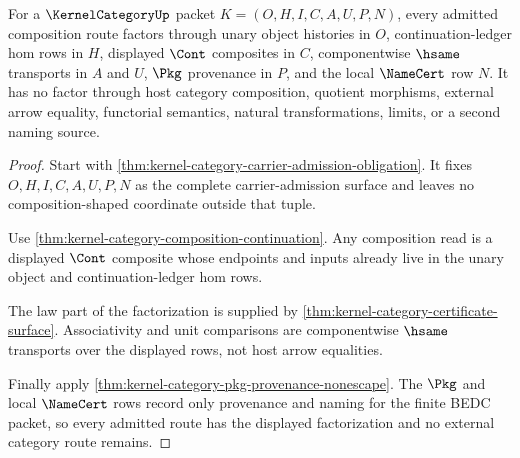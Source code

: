 \begin{theorem}
\label{thm:kernel-category-cont-route-factorization}
For a $\KernelCategoryUp$ packet $K=(O,H,I,C,A,U,P,N)$, every admitted
composition route factors through unary object histories in $O$,
continuation-ledger hom rows in $H$, displayed $\Cont$ composites in $C$,
componentwise $\hsame$ transports in $A$ and $U$, $\Pkg$ provenance in $P$,
and the local $\NameCert$ row $N$. It has no factor through host category
composition, quotient morphisms, external arrow equality, functorial
semantics, natural transformations, limits, or a second naming source.
\end{theorem}
\begin{proof}
Start with \autoref{thm:kernel-category-carrier-admission-obligation}. It
fixes $O,H,I,C,A,U,P,N$ as the complete carrier-admission surface and leaves no
composition-shaped coordinate outside that tuple.

Use \autoref{thm:kernel-category-composition-continuation}. Any composition
read is a displayed $\Cont$ composite whose endpoints and inputs already live
in the unary object and continuation-ledger hom rows.

The law part of the factorization is supplied by
\autoref{thm:kernel-category-certificate-surface}. Associativity and unit
comparisons are componentwise $\hsame$ transports over the displayed rows, not
host arrow equalities.

Finally apply \autoref{thm:kernel-category-pkg-provenance-nonescape}. The
$\Pkg$ and local $\NameCert$ rows record only provenance and naming for the
finite BEDC packet, so every admitted route has the displayed factorization
and no external category route remains.
\end{proof}

